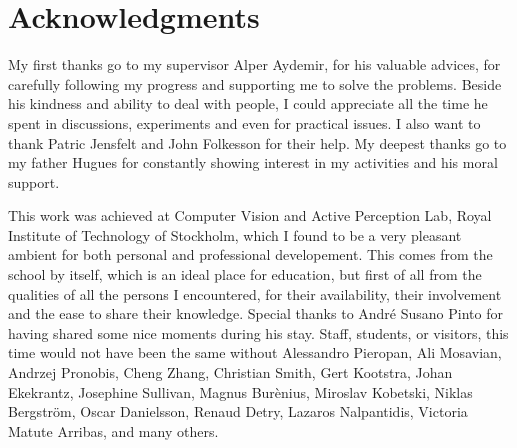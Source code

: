 \chapter{Acknowledgments}
My first thanks go to my supervisor Alper Aydemir, for his valuable advices, for carefully following my progress and supporting me to solve the problems. Beside his kindness and ability to deal with people, I could appreciate all the time he spent in discussions, experiments and even for practical issues. I also want to thank Patric Jensfelt and John Folkesson for their help. My deepest thanks go to my father Hugues for constantly showing interest in my activities and his moral support.

This work was achieved at Computer Vision and Active Perception Lab, Royal Institute of Technology of Stockholm, which I found to be a very pleasant ambient for both personal and professional developement. This comes from the school by itself, which is an ideal place for education, but first of all from the qualities of all the persons I encountered, for their availability, their involvement and the ease to share their knowledge. Special thanks to Andr\'{e} Susano Pinto for having shared some nice moments during his stay. Staff, students, or visitors, this time would not have been the same without Alessandro Pieropan, Ali Mosavian, Andrzej Pronobis, Cheng Zhang, Christian Smith, Gert Kootstra, Johan Ekekrantz, Josephine Sullivan, Magnus Bur\`{e}nius, Miroslav Kobetski, Niklas Bergstr\"{o}m, Oscar Danielsson, Renaud Detry, Lazaros Nalpantidis, Victoria Matute Arribas, and many others.


